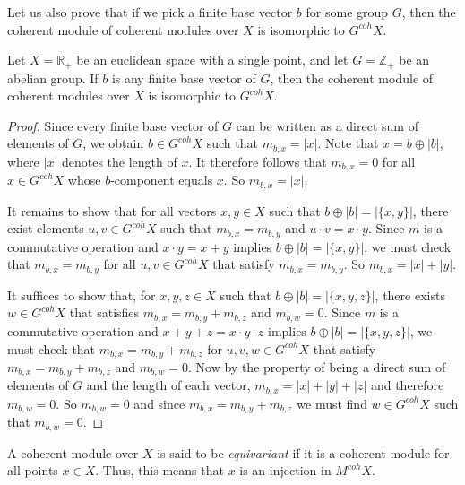 \documentclass[a4paper,reqno,oneside]{article}
\begin{document}
Let us also prove that if we pick a finite base vector $b$ for some group $G$, then the coherent module of coherent modules over $X$ is isomorphic to $G^{coh}X$.

\begin{theorem}
	Let $X = \mathbb{R}_+$ be an euclidean space with a single point, and let $G = \mathbb{Z}_+$ be an abelian group. If $b$ is any finite base vector of $G$, then the coherent module of coherent modules over $X$ is isomorphic to $G^{coh}X$.
\end{theorem}

\begin{proof}
	Since every finite base vector of $G$ can be written as a direct sum of elements of $G$, we obtain $b \in G^{coh}X$ such that $m_{b, x} = |x|$. Note that $x = b \oplus |b|$, where $|x|$ denotes the length of $x$. It therefore follows that $m_{b, x} = 0$ for all $x \in G^{coh}X$ whose $b$-component equals $x$. So $m_{b, x} = |x|$.
	
	It remains to show that for all vectors $x, y \in X$ such that $b \oplus |b| = |\{x,y\}|$, there exist elements $u, v \in G^{coh}X$ such that $m_{b, x} = m_{b, y}$ and $u \cdot v = x \cdot y$. Since $m$ is a commutative operation and $x \cdot y = x + y$ implies $b \oplus |b| = |\{x,y\}|$, we must check that $m_{b, x} = m_{b, y}$ for all $u, v \in G^{coh}X$ that satisfy $m_{b, x} = m_{b, y}$. So $m_{b, x} = |x| + |y|$.
	
	It suffices to show that, for $x, y, z \in X$ such that $b \oplus |b| = |\{x,y,z\}|$, there exists $w \in G^{coh}X$ that satisfies $m_{b, x} = m_{b, y} + m_{b, z}$ and $m_{b, w} = 0$. Since $m$ is a commutative operation and $x + y + z = x \cdot y \cdot z$ implies $b \oplus |b| = |\{x,y,z\}|$, we must check that $m_{b, x} = m_{b, y} + m_{b, z}$ for $u, v, w \in G^{coh}X$ that satisfy $m_{b, x} = m_{b, y} + m_{b, z}$ and $m_{b, w} = 0$. Now by the property of being a direct sum of elements of $G$ and the length of each vector, $m_{b, x} = |x| + |y| + |z|$ and therefore $m_{b, w} = 0$. So $m_{b, w} = 0$ and since $m_{b, x} = m_{b, y} + m_{b, z}$ we must find $w \in G^{coh}X$ such that $m_{b, w} = 0$.
\end{proof}

\begin{remark}
	A coherent module over $X$ is said to be \textit{equivariant} if it is a coherent module for all points $x \in X$. Thus, this means that $x$ is an injection in $M^{coh}X$.
\end{remark}
\end{document}
